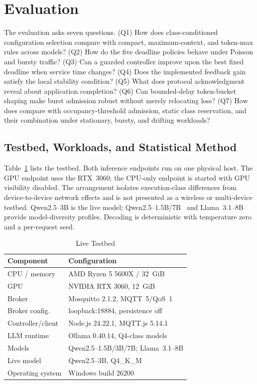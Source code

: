 \section{Evaluation}
\label{sec:evaluation}

The evaluation asks seven questions. (Q1) How does class-conditioned configuration selection compare with compact, maximum-context, and token-max rules across models? (Q2) How do the five deadline policies behave under Poisson and bursty traffic? (Q3) Can a guarded controller improve upon the best fixed deadline when service time changes? (Q4) Does the implemented feedback gain satisfy the local stability condition? (Q5) What does protocol acknowledgment reveal about application completion? (Q6) Can bounded-delay token-bucket shaping make burst admission robust without merely relocating loss? (Q7) How does \method{} compare with occupancy-threshold admission, static class reservation, and their combination under stationary, bursty, and drifting workloads?

\subsection{Testbed, Workloads, and Statistical Method}

Table~\ref{tab:testbed} lists the testbed. Both inference endpoints run on one physical host. The GPU endpoint uses the RTX~3060; the CPU-only endpoint is started with GPU visibility disabled. The arrangement isolates execution-class differences from device-to-device network effects and is not presented as a wireless or multi-device testbed. Qwen2.5--3B is the live model; Qwen2.5--1.5B/7B~\cite{qwen2025qwen25} and Llama~3.1--8B~\cite{grattafiori2024llama3} provide model-diversity profiles. Decoding is deterministic with temperature zero and a per-request seed.

\begin{table}[t]
\centering
\caption{Live Testbed}
\label{tab:testbed}
\small
\begin{tabular}{@{}ll@{}}
\toprule
Component & Configuration \\
\midrule
CPU / memory & AMD Ryzen 5 5600X / 32~GiB \\
GPU & NVIDIA RTX 3060, 12~GiB \\
Broker & Mosquitto 2.1.2, MQTT~5/QoS~1 \\
Broker config. & loopback:18884, persistence off \\
Controller/client & Node.js 24.22.1, MQTT.js 5.14.1 \\
LLM runtime & Ollama 0.40.14, Q4-class models \\
Models & Qwen2.5--1.5B/3B/7B; Llama~3.1--8B \\
Live model & Qwen2.5--3B, Q4\_K\_M \\
Operating system & Windows build 26200 \\
\bottomrule
\end{tabular}
\end{table}

